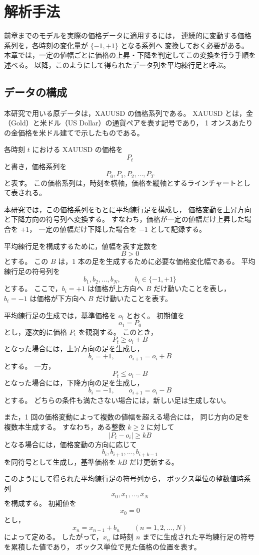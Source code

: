 \documentclass[a4j,dvipdfmx]{jsarticle}
\theoremstyle{plainnote}
\begin{document}
\section{解析手法}

前章までのモデルを実際の価格データに適用するには，
連続的に変動する価格系列を，各時刻の変化量が $\{-1,+1\}$ となる系列へ
変換しておく必要がある。
本章では，一定の値幅ごとに価格の上昇・下降を判定してこの変換を行う手順を述べる。
以降，このようにして得られたデータ列を平均練行足と呼ぶ。

\subsection{データの構成}

本研究で用いる原データは，XAUUSD の価格系列である。
XAUUSD とは，金（Gold）と米ドル（US Dollar）の通貨ペアを表す記号であり，
1 オンスあたりの金価格を米ドル建てで示したものである。

各時刻 $t$ における XAUUSD の価格を
\[
  P_t
\]
と書き，価格系列を
\[
  P_0,P_1,P_2,\ldots,P_T
\]
と表す。
この価格系列は，時刻を横軸，価格を縦軸とするラインチャートとして表される。

本研究では，この価格系列をもとに平均練行足を構成し，
価格変動を上昇方向と下降方向の符号列へ変換する。
すなわち，価格が一定の値幅だけ上昇した場合を $+1$，
一定の値幅だけ下降した場合を $-1$ として記録する。

平均練行足を構成するために，値幅を表す定数を
\[
  B>0
\]
とする。
この $B$ は，1 本の足を生成するために必要な価格変化幅である。
平均練行足の符号列を
\[
  b_1,b_2,\ldots,b_N,
  \qquad b_i\in\{-1,+1\}
\]
とする。
ここで，$b_i=+1$ は価格が上方向へ $B$ だけ動いたことを表し，
$b_i=-1$ は価格が下方向へ $B$ だけ動いたことを表す。

平均練行足の生成では，基準価格を $o_i$ とおく。
初期値を
\[
  o_1=P_0
\]
とし，逐次的に価格 $P_t$ を観測する。
このとき，
\[
  P_t \geq o_i+B
\]
となった場合には，上昇方向の足を生成し，
\[
  b_i=+1,\qquad o_{i+1}=o_i+B
\]
とする。
一方，
\[
  P_t \leq o_i-B
\]
となった場合には，下降方向の足を生成し，
\[
  b_i=-1,\qquad o_{i+1}=o_i-B
\]
とする。
どちらの条件も満たさない場合には，新しい足は生成しない。

また，1 回の価格変動によって複数の値幅を超える場合には，
同じ方向の足を複数本生成する。
すなわち，ある整数 $k\geq2$ に対して
\[
  |P_t-o_i|\geq kB
\]
となる場合には，価格変動の方向に応じて
\[
  b_i,b_{i+1},\ldots,b_{i+k-1}
\]
を同符号として生成し，基準価格を $kB$ だけ更新する。

このようにして得られた平均練行足の符号列から，
ボックス単位の整数値時系列
\[
  x_0,x_1,\ldots,x_N
\]
を構成する。
初期値を
\begin{equation}
  x_0=0
  \label{eq:analysis_x0}
\end{equation}
とし，
\begin{equation}
  x_n=x_{n-1}+b_n
  \qquad (n=1,2,\ldots,N)
  \label{eq:analysis_xn}
\end{equation}
によって定める。
したがって，$x_n$ は時刻 $n$ までに生成された平均練行足の符号を累積した値であり，
ボックス単位で見た価格の位置を表す。
\end{document}
